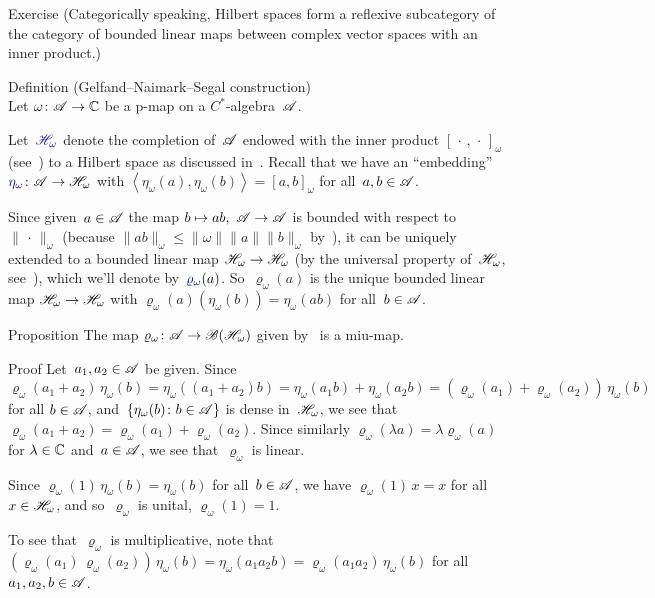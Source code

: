 \documentclass[a]{subfiles}
\begin{document}
\begin{parsec}
\begin{point}{Exercise}
(Categorically speaking,
Hilbert spaces
form a reflexive subcategory of
the category of bounded linear maps between
complex vector spaces with an inner product.)
\end{point}
\begin{point}[gns]{Definition (Gelfand--Naimark--Segal construction)}%
	\\
Let $\omega\colon \mathscr{A}\to\mathbb{C}$ be a p-map on a $C^*$-algebra~$\mathscr{A}$.

Let~$\Define{\scrH_\omega}$ denote the completion
of~$\mathscr{A}$ endowed with the inner product $[\,\cdot\,,\,\cdot\,]_\omega$
(see~)
to a Hilbert space as discussed in~.
Recall that we have an ``embedding''
$\Define{\eta_\omega}\colon \scrA\to\scrH_\omega$
with $\left<\eta_\omega(a),\eta_\omega(b)\right>
= [a,b]_\omega$ for all~$a,b\in \mathscr{A}$.

Since given~$a\in \mathscr{A}$
the map $b\mapsto ab,\ \mathscr{A}\to\mathscr{A}$ is
bounded with respect to~$\|\,\cdot\,\|_\omega$
(because $\|ab\|_\omega\leq \|\omega\|\|a\|\|b\|_\omega$
by~),
it can be uniquely extended to a bounded linear map
$\mathscr{H}_\omega\to\mathscr{H}_\omega$
(by the universal property of~$\mathscr{H}_\omega$, 
see~),
which we'll denote by~$\Define{\varrho_\omega}(a)$.
So~$\varrho_\omega(a)$ is the unique
bounded linear map $\mathscr{H}_\omega\to\mathscr{H}_\omega$
with $\varrho_\omega(a)(\eta_\omega(b)) = \eta_\omega(ab)$
for all~$b\in\mathscr{A}$.
\end{point}
\begin{point}{Proposition}%
The map $\varrho_\omega\colon \mathscr{A}\to\mathscr{B}(\mathscr{H}_\omega)$
given by~ is a miu-map.
\begin{point}{Proof}%
Let~$a_1,a_2\in\mathscr{A}$ be given.
Since $\varrho_\omega(a_1+a_2)\,\eta_\omega(b)
= \eta_\omega((a_1+a_2)b)
= \eta_\omega(a_1b)+\eta_\omega(a_2b)
= (\varrho_\omega(a_1) + \varrho_\omega(a_2))\,\eta_\omega(b)$
for all $b\in\mathscr{A}$,
and~$\{\eta_\omega(b)\colon b\in\mathscr{A}\}$
is dense in~$\mathscr{H}_\omega$,
we see that $\varrho_\omega(a_1+a_2)
=\varrho_\omega(a_1)+\varrho_\omega(a_2)$.
Since similarly $\varrho_\omega(\lambda a)
= \lambda\varrho_\omega(a)$
for $\lambda\in\mathbb{C}$ and~$a\in\mathscr{A}$,
we see that~$\varrho_\omega$ is linear.

Since $\varrho_\omega(1)\,\eta_\omega(b)
= \eta_\omega(b)$ for all~$b\in\mathscr{A}$,
we have $\varrho_\omega(1)\,x=x$
for all~$x\in\mathscr{H}_\omega$,
and so~$\varrho_\omega$ is unital,
$\varrho_\omega(1)=1$.

To see that~$\varrho_\omega$ is multiplicative,
note that
$(\varrho_\omega(a_1)\,\varrho_\omega(a_2))\,\eta_\omega(b)
= \eta_\omega(a_1a_2b)=\varrho_\omega(a_1a_2)\,\eta_\omega(b)$
for all~$a_1,a_2,b\in\mathscr{A}$.


\end{point}
\end{point}
\end{parsec}
\end{document}
